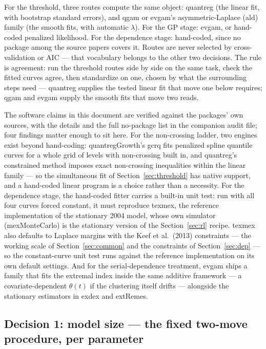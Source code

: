 \documentclass[11pt]{article}
\begin{document}
For the threshold, three routes compute the same object: quantreg (the linear fit, with bootstrap standard errors), and qgam or evgam's asymmetric-Laplace (ald) family (the smooth fits, with automatic $\lambda$). For the GP stage: evgam, or hand-coded penalized likelihood. For the dependence stage: hand-coded, since no package among the source papers covers it. Routes are never selected by cross-validation or AIC --- that vocabulary belongs to the other two decisions. The rule is agreement: run the threshold routes side by side on the same task, check the fitted curves agree, then standardize on one, chosen by what the surrounding steps need --- quantreg supplies the tested linear fit that move one below requires; qgam and evgam supply the smooth fits that move two reads.

{\color{blue}The software claims in this document are verified against the packages' own sources, with the details and the full no-package list in the companion audit file; four findings matter enough to sit here. For the non-crossing ladder, two engines exist beyond hand-coding: quantregGrowth's gcrq fits penalized spline quantile curves for a whole grid of levels with non-crossing built in, and quantreg's constrained method imposes exact non-crossing inequalities within the linear family --- so the simultaneous fit of Section~\ref{sec:threshold} has native support, and a hand-coded linear program is a choice rather than a necessity. For the dependence stage, the hand-coded fitter carries a built-in unit test: run with all four curves forced constant, it must reproduce texmex, the reference implementation of the stationary 2004 model, whose own simulator (mexMonteCarlo) is the stationary version of the Section~\ref{sec:rl} recipe. texmex also defaults to Laplace margins with {\color{green}the Keef et al.\ (2013) constraints --- the working scale of Section~\ref{sec:common} and the constraints of Section~\ref{sec:dep} --- so the constant-curve unit test runs against the reference implementation on its own default settings}. And for the serial-dependence treatment, evgam ships a family that fits the extremal index inside the same additive framework --- a covariate-dependent $\theta(t)$ if the clustering itself drifts --- alongside the stationary estimators in exdex and extRemes.}

\subsection{Decision 1: model size --- the fixed two-move procedure, per parameter}\label{sec:size}
\end{document}
